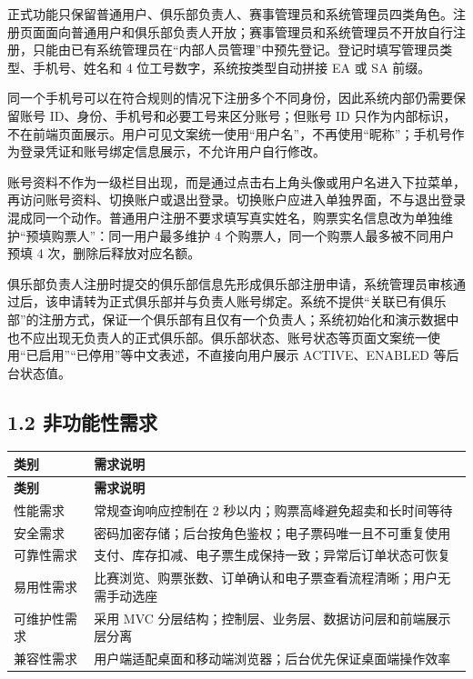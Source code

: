 \documentclass[UTF8,zihao=-4,a4paper]{ctexart}
\begin{document}
正式功能只保留普通用户、俱乐部负责人、赛事管理员和系统管理员四类角色。注册页面面向普通用户和俱乐部负责人开放；赛事管理员和系统管理员不开放自行注册，只能由已有系统管理员在“内部人员管理”中预先登记。登记时填写管理员类型、手机号、姓名和 4 位工号数字，系统按类型自动拼接 EA 或 SA 前缀。

同一个手机号可以在符合规则的情况下注册多个不同身份，因此系统内部仍需要保留账号 ID、身份、手机号和必要工号来区分账号；但账号 ID 只作为内部标识，不在前端页面展示。用户可见文案统一使用“用户名”，不再使用“昵称”；手机号作为登录凭证和账号绑定信息展示，不允许用户自行修改。

账号资料不作为一级栏目出现，而是通过点击右上角头像或用户名进入下拉菜单，再访问账号资料、切换账户或退出登录。切换账户应进入单独界面，不与退出登录混成同一个动作。普通用户注册不要求填写真实姓名，购票实名信息改为单独维护“预填购票人”：同一用户最多维护 4 个购票人，同一个购票人最多被不同用户预填 4 次，删除后释放对应名额。

俱乐部负责人注册时提交的俱乐部信息先形成俱乐部注册申请，系统管理员审核通过后，该申请转为正式俱乐部并与负责人账号绑定。系统不提供“关联已有俱乐部”的注册方式，保证一个俱乐部有且仅有一个负责人；系统初始化和演示数据中也不应出现无负责人的正式俱乐部。俱乐部状态、账号状态等页面文案统一使用“已启用”“已停用”等中文表述，不直接向用户展示 ACTIVE、ENABLED 等后台状态值。

\subsection*{1.2 非功能性需求}
{}


\begin{center}
\small
\begin{longtable}{>{\raggedright\arraybackslash}p{} >{\raggedright\arraybackslash}p{}}
\toprule
\rowcolor{tablehead}
\textbf{类别} & \textbf{需求说明} \\
\midrule
\endfirsthead
\toprule
\rowcolor{tablehead}
\textbf{类别} & \textbf{需求说明} \\
\midrule
\endhead
性能需求 & 常规查询响应控制在 2 秒以内；购票高峰避免超卖和长时间等待 \\
\midrule
安全需求 & 密码加密存储；后台按角色鉴权；电子票码唯一且不可重复使用 \\
\midrule
可靠性需求 & 支付、库存扣减、电子票生成保持一致；异常后订单状态可恢复 \\
\midrule
易用性需求 & 比赛浏览、购票张数、订单确认和电子票查看流程清晰；用户无需手动选座 \\
\midrule
可维护性需求 & 采用 MVC 分层结构；控制层、业务层、数据访问层和前端展示层分离 \\
\midrule
兼容性需求 & 用户端适配桌面和移动端浏览器；后台优先保证桌面端操作效率 \\
\midrule
\bottomrule
\end{longtable}
\end{center}
\end{document}
